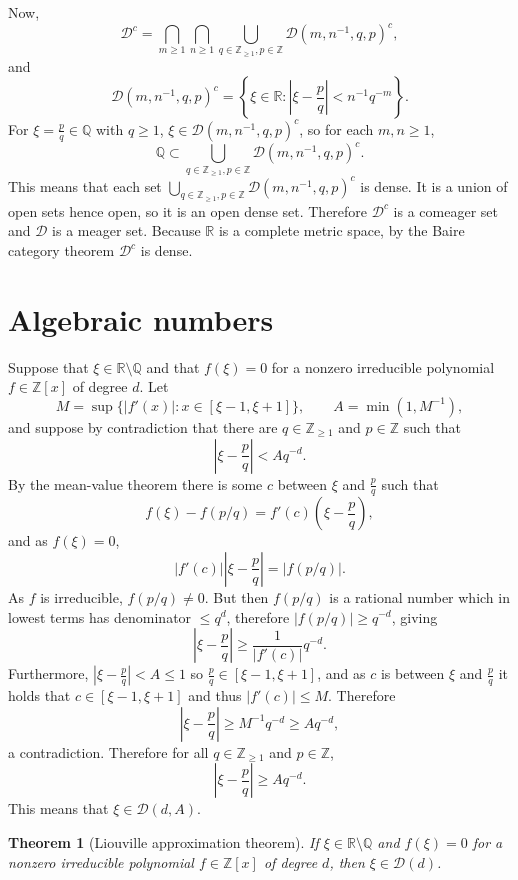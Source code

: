\documentclass{article}
\newtheorem{theorem}{Theorem}
\theoremstyle{definition}
\begin{document}
Now,
\[
\mathcal{D}^c = \bigcap_{m \geq 1} \bigcap_{n \geq 1} \bigcup_{q \in \mathbb{Z}_{\geq 1},
p \in \mathbb{Z}} \mathcal{D}(m,n^{-1},q,p)^c,
\]
and
\[
\mathcal{D}(m,n^{-1},q,p)^c = \left\{\xi \in \mathbb{R}:
\left| \xi - \frac{p}{q}\right| < n^{-1} q^{-m}\right\}.
\]
For $\xi = \frac{p}{q} \in \mathbb{Q}$ with $q \geq 1$,
$\xi \in \mathcal{D}(m,n^{-1},q,p)^c$, so for each $m,n \geq 1$, 
\[
\mathbb{Q} \subset  \bigcup_{q \in \mathbb{Z}_{\geq 1},
p \in \mathbb{Z}} \mathcal{D}(m,n^{-1},q,p)^c.
\]
This means that each set $\bigcup_{q \in \mathbb{Z}_{\geq 1},
p \in \mathbb{Z}} \mathcal{D}(m,n^{-1},q,p)^c$ is dense. It is a union of open sets hence open, so it
is an open dense set. Therefore $\mathcal{D}^c$ is a comeager set and $\mathcal{D}$ is a meager set. 
Because $\mathbb{R}$ is a complete metric space, by the Baire category theorem $\mathcal{D}^c$ is dense. 





\section{Algebraic numbers}
Suppose that $\xi \in \mathbb{R} \setminus \mathbb{Q}$ and that $f(\xi)=0$ for a nonzero irreducible  polynomial
$f \in \mathbb{Z}[x]$ of degree $d$. 
Let
\[
M = \sup \{|f'(x)|: x \in [\xi-1,\xi+1]\},\qquad A = \min(1,M^{-1}),
\]
and suppose
by contradiction that there are $q \in \mathbb{Z}_{\geq 1}$ and $p \in \mathbb{Z}$ such that
\[
\left|\xi - \frac{p}{q} \right| < Aq^{-d}.
\]
By the mean-value theorem there is some $c$ between $\xi$ and $\frac{p}{q}$
such that
\[
f(\xi)-f(p/q) = f'(c) \left(\xi-\frac{p}{q}\right),
\]
and as $f(\xi)=0$,
\[
|f'(c)| \left| \xi - \frac{p}{q} \right| = |f(p/q)|.
\]
As $f$ is irreducible, $f(p/q) \neq 0$. But then $f(p/q)$ is a rational number which in lowest
terms has denominator $\leq q^d$, 
therefore $|f(p/q)| \geq q^{-d}$, giving
\[
\left| \xi - \frac{p}{q} \right| \geq \frac{1}{|f'(c)|} q^{-d}.
\]
Furthermore, $\left| \xi - \frac{p}{q} \right| < A \leq 1$ so
$\frac{p}{q} \in [\xi-1,\xi+1]$, and as $c$ is between $\xi$ and $\frac{p}{q}$
it holds that $c \in [\xi-1,\xi+1]$ and thus $|f'(c)| \leq M$. Therefore
\[
\left| \xi - \frac{p}{q} \right| \geq M^{-1} q^{-d} \geq Aq^{-d},
\] 
a contradiction. Therefore for all $q \in \mathbb{Z}_{\geq 1}$ and
$p \in \mathbb{Z}$,
\[
\left|\xi - \frac{p}{q} \right| \geq Aq^{-d}.
\]
This means that $\xi \in \mathcal{D}(d,A)$.

\begin{theorem}[Liouville approximation theorem]
If $\xi \in \mathbb{R} \setminus \mathbb{Q}$ and  $f(\xi)=0$ for a nonzero irreducible polynomial
$f \in \mathbb{Z}[x]$ of degree $d$, then $\xi \in \mathcal{D}(d)$.
\end{theorem}
\end{document}
